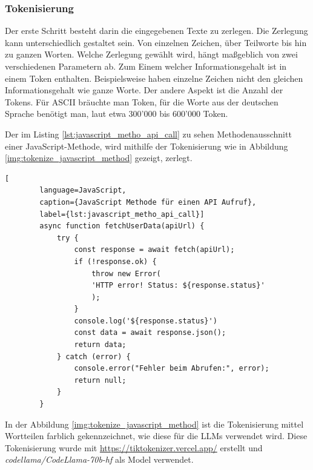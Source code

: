 \subsubsection{Tokenisierung}
Der erste Schritt besteht darin die eingegebenen Texte zu zerlegen. Die Zerlegung kann unterschiedlich gestaltet sein. Von einzelnen Zeichen, über Teilworte bis hin zu ganzen Worten. Welche Zerlegung gewählt wird, hängt maßgeblich von zwei verschiedenen Parametern ab. Zum Einem welcher Informationsgehalt ist in einem Token enthalten. Beispielsweise haben einzelne Zeichen nicht den gleichen Informationsgehalt wie ganze Worte. Der andere Aspekt ist die Anzahl der Tokens. Für ASCII bräuchte man  Token, für die Worte aus der deutschen Sprache benötigt man, laut \cite{duden_unknown-author} etwa 300'000 bis 600'000 Token.\vspace{0.2cm}

Der im Listing \ref{lst:javascript_metho_api_call} zu sehen Methodenausschnitt einer JavaScript-Methode, wird mithilfe der Tokenisierung wie in Abbildung \ref{img:tokenize_javascript_method} gezeigt, zerlegt.

\begin{center}
	\begin{lstlisting}[
		language=JavaScript,
		caption={JavaScript Methode für einen API Aufruf},
		label={lst:javascript_metho_api_call}]
		async function fetchUserData(apiUrl) {
			try {
				const response = await fetch(apiUrl);
				if (!response.ok) {
					throw new Error(
					'HTTP error! Status: ${response.status}'
					);
				}
				console.log('${response.status}')
				const data = await response.json();
				return data;
			} catch (error) {
				console.error("Fehler beim Abrufen:", error);
				return null;
			}
		}
	\end{lstlisting}
\end{center}

In der Abbildung \ref{img:tokenize_javascript_method} ist die Tokenisierung mittel Wortteilen farblich gekennzeichnet, wie diese für die LLMs verwendet wird. Diese Tokenisierung wurde mit \href{https://tiktokenizer.vercel.app/}{https://tiktokenizer.vercel.app/} erstellt und \textit{codellama/CodeLlama-70b-hf} als Model verwendet.\vspace{0.2cm}

